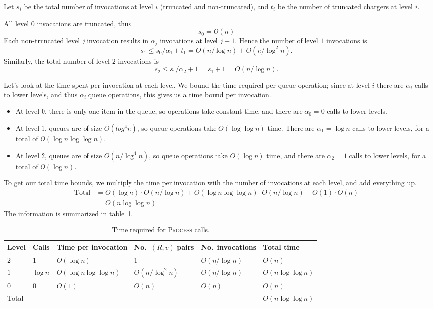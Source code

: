 \documentclass[12pt]{article}
\newcommand{\ra}[1]{\renewcommand{\arraystretch}{#1}}
\begin{document}
Let $s_i$ be the total number of invocations at level $i$ (truncated and non-truncated), and $t_i$ be the number of truncated chargers at level $i$.

All level $0$ invocations are truncated, thus
\[
s_0 = O(n)
\]
 Each non-truncated level $j$ invocation results in $\alpha_j$ invocations at level $j-1$. Hence the number of level $1$ invocations is
\[
s_1 \leq s_0/\alpha_1 + t_1 = O(n/\log n) + O(n/\log^2 n).
\]
 Similarly, the total number of level $2$ invocations is
\[
s_2 \leq s_1/\alpha_2 + 1 = s_1 + 1 = O(n/\log n).
\]

Let's look at the time spent per invocation at each level. We bound the time required per queue operation; since at level $i$ there are $\alpha_i$ calls to lower levels, and thus $\alpha_i$ queue operations, this gives us a time bound per invocation.

\begin{itemize}
\item At level $0$, there is only one item in the queue, so operations take constant time, and there are $\alpha_0 = 0$ calls to lower levels.
\item At level $1$, queues are of size $O(log^4 n)$, so queue operations take $O(\log \log n)$ time. There are $\alpha_1 = \log n$ calls to lower levels, for a total of $O(\log n \log \log n)$.
\item At level $2$, queues are of size $O(n/\log^4 n)$, so queue operations take $O(\log n)$ time, and there are $\alpha_2 = 1$ calls to lower levels, for a total of $O(\log n)$.
\end{itemize}

To get our total time bounds, we multiply the time per invocation with the number of invocations at each level, and add everything up.
\begin{align*}
  \text{Total} &= O(\log n) \cdot O(n/\log n) + O(\log n \log \log n) \cdot O(n/ \log n) + O(1) \cdot O(n) \\
               &= O(n \log \log n)
\end{align*}
The information is summarized in table~\ref{tab:process}.


\begin{table}[!h]\centering
\caption{Time required for \textsc{Process} calls.}
\label{tab:process}
\ra{1.3}
\begin{tabular}{@{}llllll@{}} \toprule
  Level & Calls & Time per invocation & No.\ $(R,v)$ pairs & No.\ invocations & Total time\\ \midrule
  $2$ & $1$ & $O(\log n)$ & 1 & $O(n/\log n)$ & $O(n)$\\
  $1$ & $\log n$ & $O(\log n \log \log n)$ & $O(n/\log^2 n)$ & $O(n/\log n)$ & $O(n\log \log n)$\\
  $0$ & $0$ & $O(1)$ & $O(n)$ & $O(n)$ & $O(n)$\\ \midrule
  Total & & & & & $O(n\log \log n)$\\
  \bottomrule
\end{tabular}
\end{table}
\end{document}

